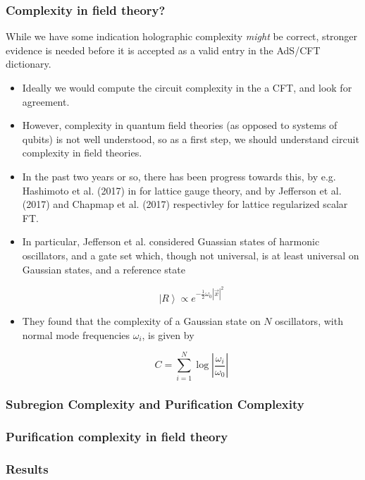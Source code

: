 \documentclass[10pt,aspectratio=169]{beamer}
\newcommand{\ket}[1]{\left| #1 \right>}
\begin{document}
\begin{frame}
\frametitle{Complexity in field theory?}

While we have some indication holographic complexity {\it might} be correct, stronger evidence is needed before it is accepted as a valid entry in the AdS/CFT dictionary.

\begin{itemize}

\item Ideally we would compute the circuit complexity in the a CFT, and look for agreement.

\item However, complexity in quantum field theories (as opposed to systems of qubits) is not well understood, so as a first step, we should understand circuit complexity in field theories.

\item In the past two years or so, there has been progress towards this, by e.g. Hashimoto et al. (2017) in for lattice gauge theory, and by Jefferson et al. (2017) and Chapmap et al. (2017) respectivley for lattice regularized scalar FT.

\item In particular, Jefferson et al. considered Guassian states of harmonic oscillators, and a gate set which, though not universal, is at least universal on Gaussian states, and a reference state

$$\ket{R} \propto e^{-\frac{1}{2} \omega_0 |\vec{x}|^2}$$ 

\item They found that the complexity of a Gaussian state on $N$ oscillators, with normal mode frequencies $\omega_i$, is given by 

$$ C = \sum_{i=1}^N \log\left| \frac{\omega_i}{\omega_0}\right|$$ 

\end{itemize}

\end{frame}

\begin{frame}
\frametitle{Subregion Complexity and Purification Complexity}

\end{frame}

\begin{frame}
\frametitle{Purification complexity in field theory}

\end{frame}

\begin{frame}
\frametitle{Results}

\end{frame}
\end{document}
